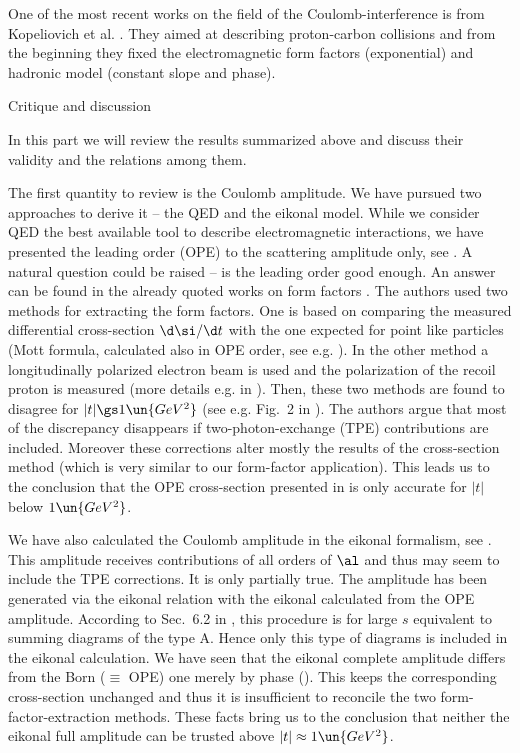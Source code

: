 One of the most recent works on the field of the Coulomb-interference is from Kopeliovich et al. . They aimed at describing proton-carbon collisions and from the beginning they fixed the electromagnetic form factors (exponential) and hadronic model (constant slope and phase).

\caption{Critique and discussion}

In this part we will review the results summarized above and discuss their validity and the relations among them.

The first quantity to review is the Coulomb amplitude. We have pursued two approaches to derive it -- the QED and the eikonal model. While we consider QED the best available tool to describe electromagnetic interactions, we have presented the leading order (OPE) to the scattering amplitude only, see . A natural question could be raised -- is the leading order good enough. An answer can be found in the already quoted works on form factors . The authors used two methods for extracting the form factors. One is based on comparing the measured differential cross-section $\d\si/\d t$ with the one expected for point like particles (Mott formula, calculated also in OPE order, see e.g. ). In the other method a longitudinally polarized electron beam is used and the polarization of the recoil proton is measured (more details e.g. in ). Then, these two methods are found to disagree for $|t| \gs 1\un{GeV^2}$ (see e.g. Fig.~2 in ). The authors argue that most of the discrepancy disappears if two-photon-exchange (TPE) contributions are included. Moreover these corrections alter mostly the results of the cross-section method (which is very similar to our form-factor application). This leads us to the conclusion that the OPE cross-section presented in  is only accurate for $|t|$ below $1\un{GeV^2}$.

We have also calculated the Coulomb amplitude in the eikonal formalism, see . This amplitude receives contributions of all orders of $\al$ and thus may seem to include the TPE corrections. It is only partially true. The amplitude has been generated via the eikonal relation  with the eikonal calculated from the OPE amplitude. According to Sec.~6.2 in , this procedure is for large $s$ equivalent to summing diagrams of the type  A. Hence only this type of diagrams is included in the eikonal calculation. We have seen that the eikonal complete amplitude differs from the Born ($\equiv$ OPE) one merely by phase (). This keeps the corresponding cross-section unchanged and thus it is insufficient to reconcile the two form-factor-extraction methods. These facts bring us to the conclusion that neither the eikonal full amplitude can be trusted above $|t|\approx 1\un{GeV^2}$.


